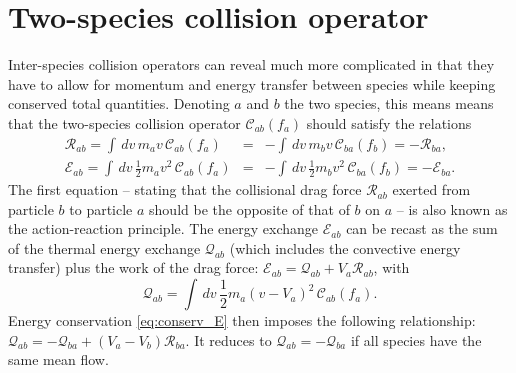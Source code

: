 \documentclass[11pt]{article}
\begin{document}
\section{Two-species collision operator}\label{sec:two_species}
Inter-species collision operators can reveal much more complicated in that they have to allow for momentum and energy transfer between species while keeping conserved total quantities. Denoting $a$ and $b$ the two species, this means means that the two-species collision operator $\mathcal{C}_{ab}(f_a)$ should satisfy the relations
%
\begin{eqnarray}
\mathcal{R}_{ab} = \int \,d v\, m_av\, \mathcal{C}_{ab}(f_a) &=& - \int \,d v\, m_bv\, \mathcal{C}_{ba}(f_b) = -\mathcal{R}_{ba} \label{eq:conserv_R}, \\
\mathcal{E}_{ab} = \int \,d v\,  \frac{1}{2}m_av^2\, \mathcal{C}_{ab}(f_a) &=& - \int \,d v\, \frac{1}{2}m_bv^2\, \mathcal{C}_{ba}(f_b) = -\mathcal{E}_{ba}  \label{eq:conserv_E}.
\end{eqnarray}
%
The first equation -- stating that the collisional drag force $\mathcal{R}_{ab}$ exerted from particle $b$ to particle $a$ should be the opposite of that of $b$ on $a$ -- is also known as the action-reaction principle. The energy exchange $\mathcal{E}_{ab}$ can be recast as the sum of the thermal energy exchange $\mathcal{Q}_{ab}$ (which includes the convective energy transfer) plus the work of the drag force: $\mathcal{E}_{ab} = \mathcal{Q}_{ab} + V_a \mathcal{R}_{ab}$, with
%
\begin{equation}  \label{eq:def_Q}
\mathcal{Q}_{ab} = \int \,d v\,  \frac{1}{2}m_a(v-V_a)^2\, \mathcal{C}_{ab}(f_a).
\end{equation} 
%
Energy conservation \eqref{eq:conserv_E} then imposes the following relationship: $\mathcal{Q}_{ab} = -\mathcal{Q}_{ba} + (V_a-V_b)\mathcal{R}_{ba}$. It reduces to $\mathcal{Q}_{ab} = -\mathcal{Q}_{ba}$ if all species have the same mean flow. 

\vspace{5mm}
\end{document}
